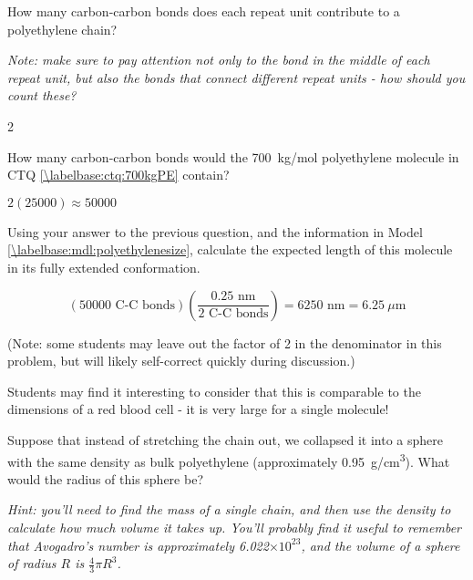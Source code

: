 \begin{activity}
\begin{ctqs}

	\question How many carbon-carbon bonds does each repeat unit contribute to a polyethylene chain?
	
		\emph{Note: make sure to pay attention not only to the bond in the middle of each repeat unit, but also the bonds that connect different repeat units - how should you count these?}
		
		\begin{solution}[1in]
			2
		\end{solution}
	
	\question How many carbon-carbon bonds would the 700~kg/mol polyethylene molecule in CTQ \ref{\labelbase:ctq:700kgPE} contain?
		
		\begin{solution}[1in]
			$2(25000)\approx 50000$
		\end{solution}
	
	\question Using your answer to the previous question, and the information in Model \ref{\labelbase:mdl:polyethylenesize}, calculate the expected length of this molecule in its fully extended conformation. \label{\labelbase:ctq:extendedPE}
		
		\begin{solution}[2in]
			\begin{equation*}
				\left(50000\text{ C-C bonds}\right)\left(\frac{0.25\text{ nm}}{2\text{ C-C bonds}}\right) = 6250\text{ nm} = 6.25~\mu\text{m}
			\end{equation*}
			
			(Note: some students may leave out the factor of 2 in the denominator in this problem, but will likely self-correct quickly during discussion.)
			
			Students may find it interesting to consider that this is comparable to the dimensions of a red blood cell - it is very large for a single molecule!
		\end{solution}
	
	\question Suppose that instead of stretching the chain out, we collapsed it into a sphere with the same density as bulk polyethylene (approximately 0.95~g/cm\textsuperscript{3}).  What would the radius of this sphere be? \label{\labelbase:ctq:collapsedPE}
	
		\emph{Hint: you'll need to find the mass of a single chain, and then use the density to calculate how much volume it takes up.  You'll probably find it useful to remember that Avogadro's number is approximately 6.022$\times 10^{23}$, and the volume of a sphere of radius $R$ is $\frac{4}{3}\pi R^3$.}
		

\end{ctqs}
\end{activity}
